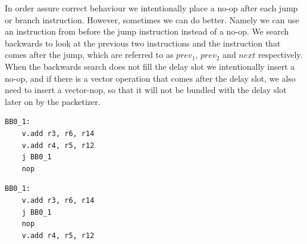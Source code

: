 In order assure correct behaviour we intentionally 
place a no-op after each jump or branch instruction. However, sometimes we can do better. Namely we can use an instruction from before the jump instruction instead of a no-op. We search backwards to look at the previous two instructions and the instruction that comes after the jump, which are referred to as $prev_1$, $prev_2$ and $next$ respectively. When the backwards search does not fill the delay slot we intentionally insert a no-op, and if there is a vector operation that comes after the delay slot, we also need to insert a vector-nop, so that it will not be bundled with the delay slot later on by the packetizer.



\label{lst:delayslot1}
\begin{center}
\hspace{2px}\begin{minipage}{.475\textwidth}
\begin{lstlisting}[frame=tlrb]
BB0_1:
    v.add r3, r6, r14
    v.add r4, r5, r12
    j BB0_1
    nop
\end{lstlisting}
\end{minipage}\hfill
\begin{minipage}{.475\textwidth}
\begin{lstlisting}[frame=tlrb]
BB0_1:
    v.add r3, r6, r14
    j BB0_1
    nop
    v.add r4, r5, r12
\end{lstlisting}
\end{minipage}
\end{center}

